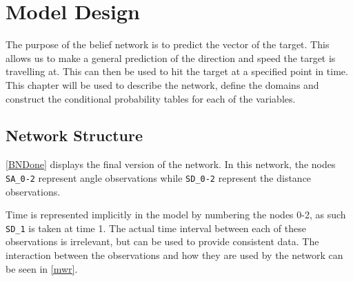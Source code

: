 \chapter{Model Design}\label{BNModel}

The purpose of the belief network is to predict the vector of the
target. This allows us to make a general prediction of the direction and speed
the target is travelling at. This can then be used to hit the target at a
specified point in time. This chapter will be used to describe the network,
define the domains and construct the conditional probability tables for each of
the variables.

\section{Network Structure}
\autoref{BNDone} displays the final version of the network. In this network, the
nodes \texttt{SA\_0-2} represent angle observations while \texttt{SD\_0-2}
represent the distance observations.


Time is represented implicitly in the model by numbering the nodes 0-2, as such
\texttt{SD\_1} is taken at time 1. The actual time interval between each of
these observations is irrelevant, but can be used to provide consistent data.
The interaction between the observations and how they are used by the
network can be seen in \autoref{mwr}.


